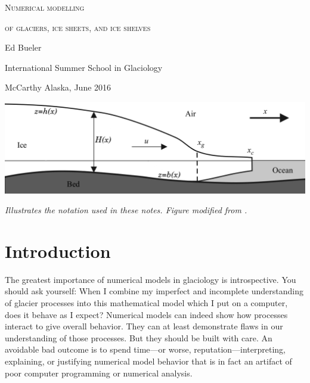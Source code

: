 \documentclass[letterpaper,final,12pt,reqno]{amsart}
\begin{document}
\graphicspath{{../figures/}}

\begin{titlepage}

  \begin{center}
  \phantom{foo}
    \vspace{1.0cm}

     {\Large \textsc{Numerical modelling}}
    \vspace{0.7cm}

     {\Large \textsc{of glaciers, ice sheets, and ice shelves}}

    \vspace{1.5cm}

    {\large Ed Bueler}
    \vspace{1cm}

    International Summer School in Glaciology

    McCarthy Alaska, June 2016

    \vfill
    
    \includegraphics[width=6.0in]{flowline}
  
    \scriptsize \emph{Illustrates the notation used in these notes.  Figure modified from \cite{SchoofMarine1}.} \normalsize
    
    \vspace{1.5in}
  \end{center}
\end{titlepage}

\clearpage\newpage

\section{Introduction}

The greatest importance of numerical models in glaciology is introspective.  You should ask yourself: When I combine my imperfect and incomplete understanding of glacier processes into this mathematical model which I put on a computer, does it behave as I expect?  Numerical models can indeed show how processes interact to give overall behavior.  They can at least demonstrate flaws in our understanding of those processes.  But they should be built with care.  An avoidable bad outcome is to spend time---or worse, reputation---interpreting, explaining, or justifying numerical model behavior that is in fact an artifact of poor computer programming or numerical analysis.
\end{document}
